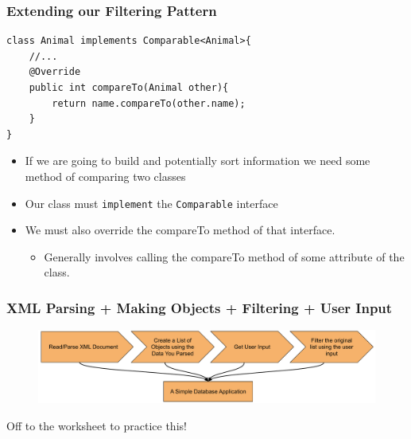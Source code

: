 \documentclass{beamer}
\begin{document}
\begin{frame}[fragile]
    \frametitle{Extending our Filtering Pattern}
    \begin{lstlisting}[basicstyle=\scriptsize]
class Animal implements Comparable<Animal>{
    //...
    @Override
    public int compareTo(Animal other){
        return name.compareTo(other.name);
    }
}
    \end{lstlisting}
    \vfill
    \begin{itemize}
        \item If we are going to build and potentially sort information we need some method of comparing two classes
        \item Our class must \lstinline|implement| the \lstinline|Comparable| interface
        \item We must also override the compareTo method of that interface.
            \begin{itemize}
                \item Generally involves calling the compareTo method of some attribute of the class.
            \end{itemize}
    \end{itemize}
\end{frame}

\begin{frame}
    \frametitle{XML Parsing + Making Objects + Filtering + User Input}
    \vfill
    \begin{figure}
        \centering
        \includegraphics[width=\textwidth]{./imgs/databaseapp.pdf}
    \end{figure}
    \vfill
    Off to the worksheet to practice this!
\end{frame}
\end{document}
